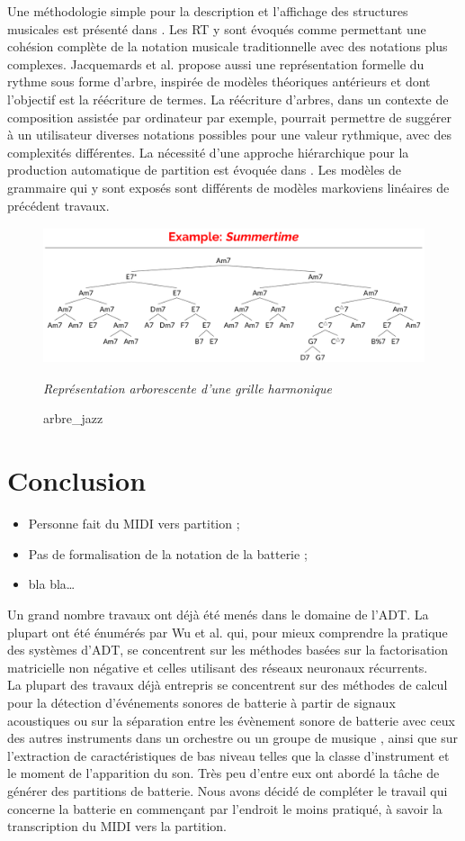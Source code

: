 Une méthodologie simple pour la description et l'affichage des structures musicales est présenté dans \cite{rythm_tree}. Les RT y sont évoqués comme permettant une cohésion complète de la notation musicale traditionnelle avec des notations plus complexes. Jacquemards et al.\cite{jacquemard:hal-01134096} propose aussi une représentation formelle du rythme sous forme d'arbre, inspirée de modèles théoriques antérieurs et dont l’objectif est la réécriture de termes. La réécriture d’arbres, dans un contexte de composition assistée par ordinateur par exemple, pourrait permettre de suggérer à un utilisateur diverses notations possibles pour une valeur rythmique, avec des complexités différentes. La nécessité d’une approche hiérarchique pour la production automatique de partition est évoquée dans \cite{foscarin:hal-01988990}. Les modèles de grammaire qui y sont exposés sont différents de modèles markoviens linéaires de précédent travaux.\newpage
\begin{figure}[h]
	\centering
	\includegraphics[height=40mm, width=120mm]{z_images/2_etat_de_l_art/summertime_tree.png}
	\caption{arbre\_jazz}
	\textit{Représentation arborescente d’une grille harmonique}\cite{harasimjazz}
\end{figure}
\section*{Conclusion}
\begin{itemize}
	\item Personne fait du MIDI vers partition ;
	\item Pas de formalisation de la notation de la batterie ;
	\item bla bla…
\end{itemize}
Un grand nombre travaux ont déjà été menés dans le domaine de l’ADT. La plupart ont été énumérés par Wu et al. \cite{Review_ADT} qui, pour mieux comprendre la pratique des systèmes d’ADT, se concentrent sur les méthodes basées sur la factorisation matricielle non négative et celles utilisant des réseaux neuronaux récurrents.\\
La plupart des travaux déjà entrepris se concentrent sur des méthodes de calcul pour la détection d'événements sonores de batterie à partir de signaux acoustiques ou sur la séparation entre les évènement sonore de batterie avec ceux des autres instruments dans un orchestre ou un groupe de musique \cite{2802}, ainsi que sur l'extraction de caractéristiques de bas niveau telles que la classe d'instrument et le moment de l'apparition du son. Très peu d'entre eux ont abordé la tâche de générer des partitions de batterie.
Nous avons décidé de compléter le travail qui concerne la batterie en commençant par l’endroit le moins pratiqué, à savoir la transcription du MIDI vers la partition.